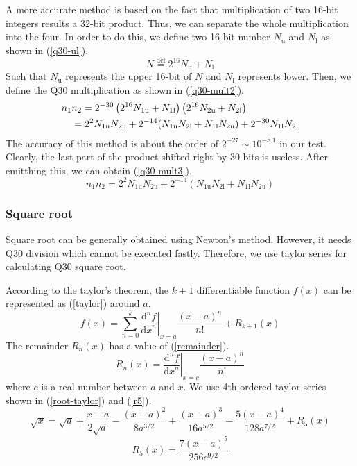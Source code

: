 \documentclass[journal]{IEEEtran}
\begin{document}
A more accurate method is based on the fact that multiplication of two 16-bit integers results a 32-bit product.
Thus, we can separate the whole multiplication into the four.
In order to do this, we define two 16-bit number \(N_{\mathrm{u}}\) and \(N_{\mathrm{l}}\) as shown in (\ref{q30-ul}).
\begin{equation}
    N \overset{\mathrm{def}}{=} 2^{16}N_{\mathrm{u}} + N_{\mathrm{l}} \label{q30-ul}
\end{equation}
Such that \(N_{\mathrm{u}}\) represents the upper 16-bit of \(N\) and \(N_{\mathrm{l}}\) represents lower.
Then, we define the Q30 multiplication as shown in (\ref{q30-mult2}).
\begin{align}
    n_1&n_2 = 2^{-30}\left(2^{16}N_{\mathrm{1u}} + N_{\mathrm{1l}}\right)\left(2^{16}N_{\mathrm{2u}} + N_{\mathrm{2l}}\right) \notag \\
    &= 2^2N_{\mathrm{1u}}N_{\mathrm{2u}} + 2^{-14}(N_{\mathrm{1u}}N_{\mathrm{2l}} + N_{\mathrm{1l}}N_{\mathrm{2u}}) + 2^{-30}N_{\mathrm{1l}}N_{\mathrm{2l}} \label{q30-mult2}
\end{align}
The accuracy of this method is about the order of \(2^{-27} \sim 10^{-8.1}\) in our test.
Clearly, the last part of the product shifted right by 30 bits is useless.
After emitthing this, we can obtain (\ref{q30-mult3}).
\begin{equation}
    n_1n_2 = 2^{2}N_{\mathrm{1u}}N_{\mathrm{2u}} + 2^{-14}(N_{\mathrm{1u}}N_{\mathrm{2l}} + N_{\mathrm{1l}}N_{\mathrm{2u}}) \label{q30-mult3}
\end{equation}

\subsubsection{Square root}
Square root can be generally obtained using Newton's method.
However, it needs Q30 division which cannot be executed fastly.
Therefore, we use taylor series for calculating Q30 square root.

According to the taylor's theorem, the \(k + 1\) differentiable function \(f(x)\) can be represented as (\ref{taylor}) around \(a\).
\begin{equation}
    f(x) = \sum_{n=0}^{k} \left.\frac{\mathrm{d}^n f}{{\mathrm{d}x}^n}\right|_{x=a}\frac{(x - a)^n}{n!} + R_{k+1}(x) \label{taylor}
\end{equation}
The remainder \(R_{n}(x)\) has a value of (\ref{remainder}).
\begin{equation}
     R_{n}(x) = \left.\frac{\mathrm{d}^n f}{{\mathrm{d}x}^n}\right|_{x=c}\frac{(x - a)^n}{n!} \label{remainder}
\end{equation}
where \(c\) is a real number between \(a\) and \(x\).
We use 4th ordered taylor series shown in (\ref{root-taylor}) and (\ref{r5}).
\begin{equation}
    \sqrt{x} = \sqrt{a} + \frac{x - a}{2\sqrt{a}} - \frac{(x - a)^2}{8a^{3/2}} + \frac{(x - a)^3}{16a^{5/2}} - \frac{5(x-a)^4}{128a^{7/2}} + R_{5}(x) \label{root-taylor}
\end{equation}
\begin{equation}
    R_5(x) = \frac{7(x-a)^5}{256c^{9/2}} \label{r5}
\end{equation}
\end{document}
